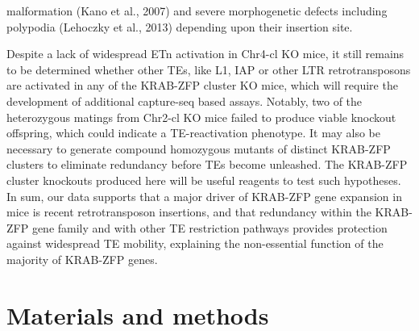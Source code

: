 \documentclass[11pt,a4paper]{article}
\begin{document}
malformation (Kano et al., 2007) and severe morphogenetic defects including polypodia (Lehoczky et al., 2013) depending upon their insertion site.

Despite a lack of widespread ETn activation in Chr4-cl KO mice, it still remains to be determined whether other TEs, like L1, IAP or other LTR retrotransposons are activated in any of the KRAB-ZFP cluster KO mice, which will require the development of additional capture-seq based assays. Notably, two of the heterozygous matings from Chr2-cl KO mice failed to produce viable knockout offspring, which could indicate a TE-reactivation phenotype. It may also be necessary to generate compound homozygous mutants of distinct KRAB-ZFP clusters to eliminate redundancy before TEs become unleashed. The KRAB-ZFP cluster knockouts produced here will be useful reagents to test such hypotheses. In sum, our data supports that a major driver of KRAB-ZFP gene expansion in mice is recent retrotransposon insertions, and that redundancy within the KRAB-ZFP gene family and with other TE restriction pathways provides protection against widespread TE mobility, explaining the non-essential function of the majority of KRAB-ZFP genes.

\section{Materials and methods}
\end{document}

